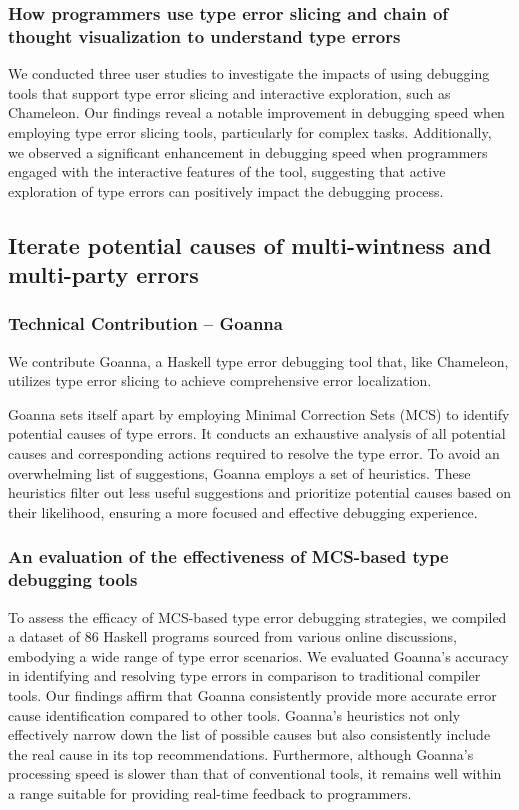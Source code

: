 \subsubsection{How programmers use type error slicing and chain of thought visualization to understand type errors}
We conducted three user studies to investigate the impacts of using debugging tools that support type error slicing and interactive exploration, such as Chameleon. Our findings reveal a notable improvement in debugging speed when employing type error slicing tools, particularly for complex tasks. Additionally, we observed a significant enhancement in debugging speed when programmers engaged with the interactive features of the tool, suggesting that active exploration of type errors can positively impact the debugging process.

\subsection{Iterate potential causes of multi-wintness and multi-party errors}

\subsubsection{Technical Contribution -- Goanna}

We contribute Goanna, a Haskell type error debugging tool that, like Chameleon, utilizes type error slicing to achieve comprehensive error localization.

Goanna sets itself apart by employing Minimal Correction Sets (MCS) to identify potential causes of type errors. It conducts an exhaustive analysis of all potential causes and corresponding actions required to resolve the type error. To avoid an overwhelming list of suggestions, Goanna employs a set of heuristics. These heuristics filter out less useful suggestions and prioritize potential causes based on their likelihood, ensuring a more focused and effective debugging experience.


\subsubsection{An evaluation of the effectiveness of MCS-based type debugging tools}
To assess the efficacy of MCS-based type error debugging strategies, we compiled a dataset of 86 Haskell programs sourced from various online discussions, embodying a wide range of type error scenarios. We evaluated Goanna's accuracy in identifying and resolving type errors in comparison to traditional compiler tools. Our findings affirm that Goanna consistently provide more accurate error cause identification compared to other tools. Goanna's heuristics not only effectively narrow down the list of possible causes but also consistently include the real cause in its top recommendations. Furthermore, although Goanna's processing speed is slower than that of conventional tools, it remains well within a range suitable for providing real-time feedback to programmers. 

